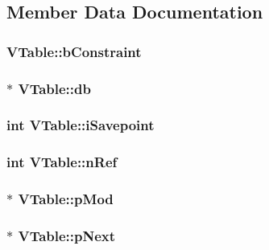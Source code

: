 \subsection{Member Data Documentation}
\hypertarget{struct_v_table_a5a970416a76dbe3be500c9458c89550d}{
\subsubsection[{b\-Constraint}]{ V\-Table\-::b\-Constraint}}\label{struct_v_table_a5a970416a76dbe3be500c9458c89550d}
\hypertarget{struct_v_table_a855b43c118d693910e9060cc9d9ac91a}{
\subsubsection[{db}]{$\ast$ V\-Table\-::db}}\label{struct_v_table_a855b43c118d693910e9060cc9d9ac91a}
\hypertarget{struct_v_table_a19f1c6c5f5fedabba7e605bbe15358e4}{
\subsubsection[{i\-Savepoint}]{\setlength{\rightskip}{0pt plus 5cm}int V\-Table\-::i\-Savepoint}}\label{struct_v_table_a19f1c6c5f5fedabba7e605bbe15358e4}
\hypertarget{struct_v_table_a12ffe156e5e8e7d19ed029ccfe4ab5dc}{
\subsubsection[{n\-Ref}]{\setlength{\rightskip}{0pt plus 5cm}int V\-Table\-::n\-Ref}}\label{struct_v_table_a12ffe156e5e8e7d19ed029ccfe4ab5dc}
\hypertarget{struct_v_table_ae444452a7168e2f4224a75768abe8312}{
\subsubsection[{p\-Mod}]{$\ast$ V\-Table\-::p\-Mod}}\label{struct_v_table_ae444452a7168e2f4224a75768abe8312}
\hypertarget{struct_v_table_af3cac5e5a38508d0111acb9aa6c5f435}{
\subsubsection[{p\-Next}]{$\ast$ V\-Table\-::p\-Next}}\label{struct_v_table_af3cac5e5a38508d0111acb9aa6c5f435}
